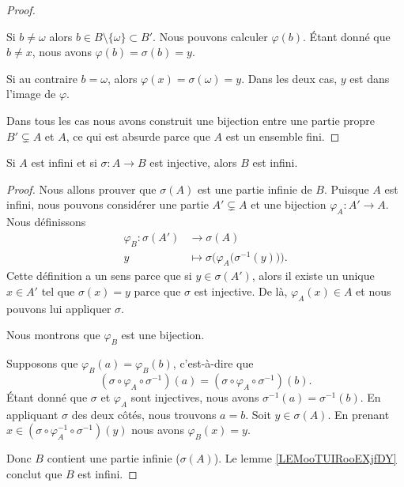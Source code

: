 \begin{proof}
\begin{subproof}
\begin{subproof}
			Si \( b\neq \omega\) alors \( b\in B\setminus\{ \omega \}\subset B'\). Nous pouvons calculer \( \varphi(b)\). Étant donné que \( b\neq x\), nous avons \( \varphi(b)=\sigma(b)=y\).

			Si au contraire \( b=\omega\), alors \( \varphi(x)=\sigma(\omega)=y\). Dans les deux cas, \( y\) est dans l'image de \( \varphi\).
		\end{subproof}
	\end{subproof}
	Dans tous les cas nous avons construit une bijection entre une partie propre \( B'\subsetneq A\) et \( A\), ce qui est absurde parce que \( A\) est un ensemble fini.
\end{proof}

\begin{proposition}    \label{PROPooWKSIooHcfYPN}
	Si \( A\) est infini et si \( \sigma\colon A\to B\) est injective, alors \( B\) est infini.
\end{proposition}

\begin{proof}
	Nous allons prouver que \( \sigma(A)\) est une partie infinie de \( B\). Puisque \( A\) est infini, nous pouvons considérer une partie \( A'\subsetneq A\) et une bijection \( \varphi_A\colon A'\to A\). Nous définissons
	\begin{equation}
		\begin{aligned}
			\varphi_B\colon \sigma(A') & \to \sigma(A)                                                   \\
			y                          & \mapsto \sigma\Big( \varphi_A\big( \sigma^{-1}(y) \big)  \Big).
		\end{aligned}
	\end{equation}
	Cette définition a un sens parce que si \( y\in \sigma(A')\), alors il existe un unique \( x\in A'\) tel que \( \sigma(x)=y\) parce que \( \sigma\) est injective. De là, \( \varphi_A(x)\in A\) et nous pouvons lui appliquer \( \sigma\).

	Nous montrons que \( \varphi_B\) est une bijection.
	\begin{subproof}
		\spitem[Injective]
		Supposons que \( \varphi_B(a)=\varphi_B(b)\), c'est-à-dire que
		\begin{equation}
			(\sigma\circ\varphi_A\circ\sigma^{-1})(a)=(\sigma\circ\varphi_A\circ\sigma^{-1})(b).
		\end{equation}
		Étant donné que \( \sigma\) et \( \varphi_A\) sont injectives, nous avons \( \sigma^{-1}(a)=\sigma^{-1}(b)\). En appliquant \( \sigma\) des deux côtés, nous trouvons \( a=b\).
		\spitem[surjective]
		Soit \( y\in \sigma(A)\). En prenant \( x\in(\sigma\circ\varphi_A^{-1}\circ\sigma^{-1})(y)\) nous avons \( \varphi_B(x)=y\).
	\end{subproof}
	Donc \( B\) contient une partie infinie (\( \sigma(A)\)). Le lemme \ref{LEMooTUIRooEXjfDY} conclut que \( B\) est infini.
\end{proof}

